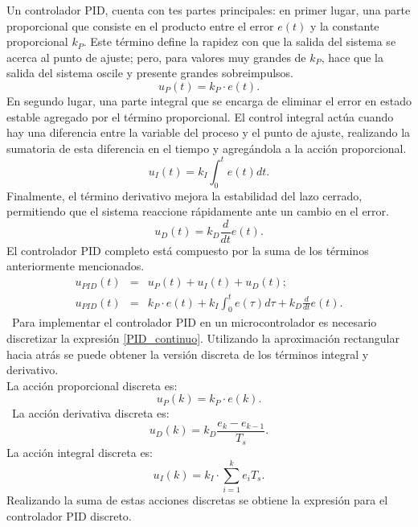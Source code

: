 Un controlador PID, cuenta con tes partes principales: en primer lugar, una parte proporcional que consiste en el producto entre el error $e(t)$ y la constante proporcional $k_P$. Este término define la rapidez con que la salida del sistema se acerca al punto de ajuste; pero, para valores muy grandes de $k_P$, hace que la salida del sistema oscile y presente grandes sobreimpulsos.
$$
u_P(t)=k_{P}\cdot e(t).  
$$
En segundo lugar, una parte integral que se encarga de eliminar el error en estado estable agregado por el término proporcional. El control integral actúa cuando hay una diferencia entre la variable del proceso y el punto de ajuste, realizando la sumatoria de esta diferencia en el tiempo y agregándola a la acción proporcional.\\
$$
u_I(t) = k_{I}\int_{0}^{t}{e(t)dt}.
$$
Finalmente, el término derivativo mejora la estabilidad del lazo cerrado, permitiendo que el sistema reaccione rápidamente ante un cambio en el error.\\

$$
u_D(t) = k_{D}\frac{d}{dt}e(t).
$$
El controlador  PID completo está compuesto por la suma de los términos anteriormente mencionados.
\begin{eqnarray}
u_{PID}(t) & = & u_P(t) + u_I(t) + u_D(t); \\
u_{PID}(t) & = & k_{P}\cdot e(t) + k_I\int_{0}^{t}{e(\tau)d\tau} + k_{D}\frac{d}{dt}e(t).
\label{PID_continuo}
\end{eqnarray}\
Para implementar el controlador PID en un microcontrolador es necesario discretizar  la expresión \ref{PID_continuo}. Utilizando la aproximación rectangular hacia atrás se puede obtener la versión discreta de los términos integral y derivativo.\\
La acción proporcional discreta es:
$$
u_P(k)=k_{P}\cdot e(k).  
$$\
La acción derivativa discreta es:
$$
u_D(k) = k_{D}\frac{e_k-e_{k-1}}{T_s}.
$$
La acción integral discreta es:
$$
u_I(k) =  k_{I}\cdot \displaystyle\sum_{i=1}^{k} e_{i}T_s.
$$
Realizando la suma de estas acciones discretas se obtiene la expresión para el controlador PID discreto.\\

